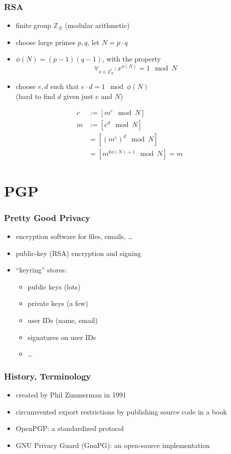 \documentclass{beamer}
\begin{document}
\begin{frame}
  \frametitle{RSA}

  \begin{itemize}
    \item finite group $\mathbb{Z}_N$ (modular arithmetic)
    \item choose large primes $p, q$, let $N = p \cdot q$
    \item $\phi(N) = (p - 1)(q - 1)$, with the property $$\forall_{x\in\mathbb{Z}^*_N}: x^{\phi(N)} = 1 \mod N$$
    \item choose $e, d$ such that $e \cdot d = 1 \mod \phi(N)$\\
    (hard to find $d$ given just $e$ and $N$)
  \end{itemize}
  \begin{align*}
  c &:= [m^e \mod N]\\
  m &:= [c^d \mod N]\\
    &= [(m^e)^d \mod N]\\
    &= [m^{k\phi(N) + 1} \mod N] = m
  \end{align*}
\end{frame}


\section{PGP}

\begin{frame}
  \frametitle{Pretty Good Privacy}

  \begin{itemize}
    \item encryption software for files, emails, \ldots
    \item public-key (RSA) encryption and signing
    \item ``keyring'' stores:
      \begin{itemize}
        \item public keys (lots)
        \item private keys (a few)
        \item user IDs (name, email)
        \item signatures on user IDs
        \item \ldots
      \end{itemize}
  \end{itemize}
\end{frame}

\begin{frame}
  \frametitle{History, Terminology}

  \begin{itemize}
    \item created by Phil Zimmerman in 1991
    \item circumvented export restrictions by publishing source code in a book
    \item OpenPGP: a standardized protocol
    \item GNU Privacy Guard (GnuPG): an open-source implementation
  \end{itemize}
\end{frame}
\end{document}
